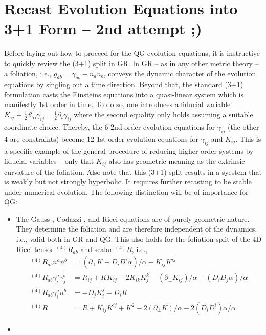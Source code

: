 \documentclass[a4paper,oneside,openany,11pt]{memoir}
\numberwithin{equation}{section} %
\newcommand{\aaron}[1]{{\color{cyan} #1}}
\begin{document}
\aaron{

\section{Recast Evolution Equations into 3+1 Form -- 2nd attempt ;)}

Before laying out how to proceed for the QG evolution equations, it is instructive to quickly review the (3+1) split in GR. In GR -- as in any other metric theory -- a foliation, i.e., $g_{ab} = \gamma_{ab} - n_an_b$, conveys the dynamic character of the evolution equations by singling out a time direction.  Beyond that, the standard (3+1) formulation casts the Einsteins equations into a quasi-linear system which is manifestly 1st order in time. To do so, one introduces a fiducial variable $K_{ij}\equiv\frac{1}{2}\pounds_\mathbf{n}\gamma_{ij} = \frac{1}{2}\partial_t\gamma_{ij}$ where the second equality only holds assuming a suitable coordinate choice. Thereby, the 6 2nd-order evolution equations for $\gamma_{ij}$ (the other 4 are constraints) become 12 1st-order evolution equations for $\gamma_{ij}$ and $K_{ij}$. This is a specific example of the general procedure of reducing higher-order systems by fiducial variables -- only that $K_{ij}$ also has geometric meaning as the extrinsic curvature of the foliation. Also note that this (3+1) split results in a syestem that is weakly but not strongly hyperbolic. It requires further recasting to be stable under numerical evolution. The following distinction will be of importance for QG:
\begin{itemize}
	\item
	The Gauss-, Codazzi-, and Ricci equations are of purely geometric nature. They determine the foliation and are therefore independent of the dynamics, i.e., valid both in GR and QG. This also holds for the foliation split of the 4D Ricci tensor $^{(4)}R_{ab}$ and scalar $^{(4)}R$, i.e.,
	\begin{align}
	\label{eq:gaussCodazziRicci}
	^{(4)}R_{ab} n^a n^b &= (\partial_\bot K + D_i D^i \alpha)/\alpha - K_{ij} K^{ij} \\
	^{(4)}R_{ab} \gamma^a_i \gamma^b_j &= R_{ij} + K K_{ij} - 2 K_{ik} K^{k}_j - (\partial_\bot K_{ij})/\alpha
	-(D_i D_j \alpha)/\alpha \\
	^{(4)}R_{ab} \gamma^a_i n^b &= - D_j K^j_i + D_i K \\
	^{(4)}R &= R + K_{ij} K^{ij} + K^2 - 2 (\partial_\bot K) /\alpha - 2 (D_i D^i) \alpha / \alpha
	\end{align}
	\item

\end{itemize}}
\end{document}
